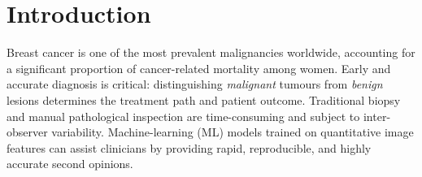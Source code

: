 \documentclass[12pt,a4paper]{article}
\begin{document}
\pagecolor{white}\color{black}

\tableofcontents
\newpage

\begin{abstract}
\noindent
This report presents a comprehensive data science analysis of the \textbf{Breast Cancer
Wisconsin (Diagnostic)} dataset obtained from the UCI Machine Learning Repository.
The dataset contains 569 patient records described by 30 numerical features extracted
from digitised fine needle aspirate (FNA) images of breast masses.  We perform
extensive data pre-processing and statistical analysis, apply two supervised
classification algorithms --- Support Vector Machine (SVM) with an RBF kernel and
$k$-Nearest Neighbours (kNN, $k{=}5$) --- and two unsupervised clustering algorithms ---
$k$-Means and DBSCAN.  The SVM classifier achieves \textbf{98.25\%} accuracy and a
ROC-AUC of \textbf{0.9950}, outperforming kNN (96.49\% accuracy, AUC~0.9792). Among
clustering methods, DBSCAN yields a lower weighted entropy (0.4314) than $k$-Means
(0.4526), while $k$-Means provides a lower SSE (11\,595.5) for its dense spherical
clusters. These results demonstrate the viability of machine-learning methods for
automated breast-cancer screening.
\end{abstract}

\newpage

\section{Introduction}

Breast cancer is one of the most prevalent malignancies worldwide, accounting for a
significant proportion of cancer-related mortality among women. Early and accurate
diagnosis is critical: distinguishing \emph{malignant} tumours from \emph{benign}
lesions determines the treatment path and patient outcome. Traditional biopsy and
manual pathological inspection are time-consuming and subject to inter-observer
variability. Machine-learning (ML) models trained on quantitative image features can
assist clinicians by providing rapid, reproducible, and highly accurate second opinions.
\end{document}
